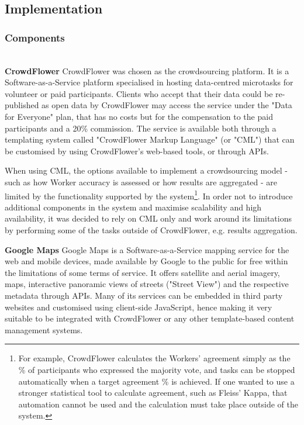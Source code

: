 \subsection{Implementation}

\subsubsection{Components} \leavevmode \\ %

\textbf{CrowdFlower} CrowdFlower was chosen as the crowdsourcing platform. It is a Software-as-a-Service platform specialised in hosting data-centred microtasks for volunteer or paid participants. Clients who accept that their data could be re-published as open data by CrowdFlower may access the service under the "Data for Everyone" plan, that has no costs but for the compensation to the paid participants and a 20\% commission. The service is available both through a templating system called "CrowdFlower Markup Language" (or "CML") that can be customised by using CrowdFlower's web-based tools, or through APIs. 

When using CML, the options available to implement a crowdsourcing model - such as how Worker accuracy is assessed or how results are aggregated - are limited by the functionality supported by the system\footnote{For example, CrowdFlower calculates the Workers' agreement simply as the \% of participants who expressed the majority vote, and tasks can be stopped automatically when a target agreement \% is achieved. If one wanted to use a stronger statistical tool to calculate agreement, such as Fleiss' Kappa, that automation cannot be used and the calculation must take place outside of the system.}. In order not to introduce additional components in the system and maximise scalability and high availability, it was decided to rely on CML only and work around its limitations by performing some of the tasks outside of CrowdFlower, e.g. results aggregation. 

\textbf{Google Maps} Google Maps is a Software-as-a-Service mapping service for the web and mobile devices, made available by Google to the public for free within the limitations of some terms of service. It offers satellite and aerial imagery, maps, interactive panoramic views of streets ("Street View") and the respective metadata through APIs. Many of its services can be embedded in third party websites and customised using client-side JavaScript, hence making it very suitable to be integrated with CrowdFlower or any other template-based content management systems. 

